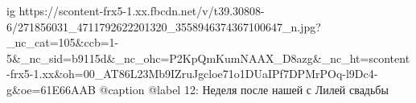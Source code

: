  
 
 
 
 

\ifcmt
  ig https://scontent-frx5-1.xx.fbcdn.net/v/t39.30808-6/271856031_4711792622201320_3558946374367100647_n.jpg?_nc_cat=105&ccb=1-5&_nc_sid=b9115d&_nc_ohc=P2KpQmKumNAAX_D8azg&_nc_ht=scontent-frx5-1.xx&oh=00_AT86L23Mb9IZruJgcloe71o1DUaIPf7DPMrPOq-l9Dc4-g&oe=61E66AAB
  @caption @label 12: Неделя после нашей с Лилей свадьбы
\fi
